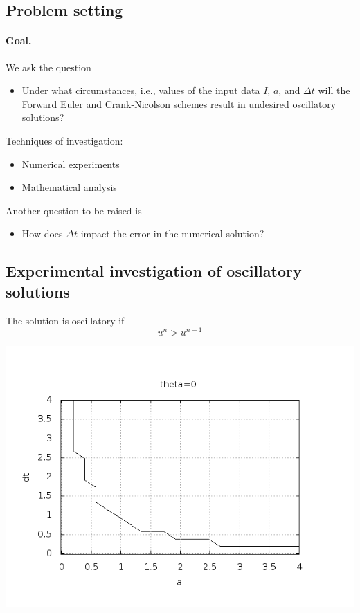 \documentclass[%
oneside,                 %
final,                   %
10pt]{article}
\begin{document}
\noindent
\subsection*{Problem setting}


\paragraph{Goal.}
We ask the question

\begin{itemize}
  \item Under what circumstances, i.e., values of
    the input data $I$, $a$, and $\Delta t$ will the Forward Euler and
    Crank-Nicolson schemes result in undesired oscillatory solutions?
\end{itemize}

\noindent
Techniques of investigation:

\begin{itemize}
 \item Numerical experiments

 \item Mathematical analysis
\end{itemize}

\noindent
Another question to be raised is

\begin{itemize}
 \item How does $\Delta t$ impact the error in the numerical solution?
\end{itemize}

\noindent



\subsection*{Experimental investigation of oscillatory solutions}

The solution is oscillatory if
\[ u^{n} > u^{n-1}\]



\centerline{\includegraphics[width=0.9\linewidth]{fig-analysis/osc_region_FE.png}}
\end{document}
